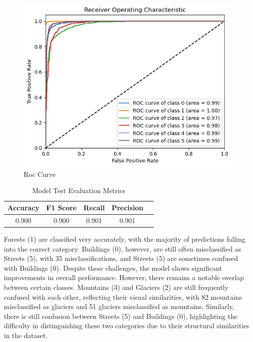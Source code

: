 \begin{figure}[H]
    \centering
    \includegraphics[width=1\linewidth]{images/densenet_roc.png}
    \caption{Roc Curve}
    \label{fig:rocincial}
\end{figure}

\begin{table}[H]
    \centering
    \caption{Model Test Evaluation Metrics} 
    \begin{tabular}{||c|c|c|c|c||} 
        \hline
        Accuracy & F1 Score & Recall & Precision \\
        \hline\hline
        0.900 & 0.900 & 0.901 & 0.901 \\
        \hline
    \end{tabular}
    \label{tab:tab_LogReg}
\end{table}

Forests (1) are classified very accurately, with the majority of predictions falling into the correct category. Buildings (0), however, are still often misclassified as Streets (5), with 35 misclassifications, and Streets (5) are sometimes confused with Buildings (0). Despite these challenges, the model shows significant improvements in overall performance. However, there remains a notable overlap between certain classes. Mountains (3) and Glaciers (2) are still frequently confused with each other, reflecting their visual similarities, with 82 mountains misclassified as glaciers and 51 glaciers misclassified as mountains. Similarly, there is still confusion between Streets (5) and Buildings (0), highlighting the difficulty in distinguishing these two categories due to their structural similarities in the dataset.

